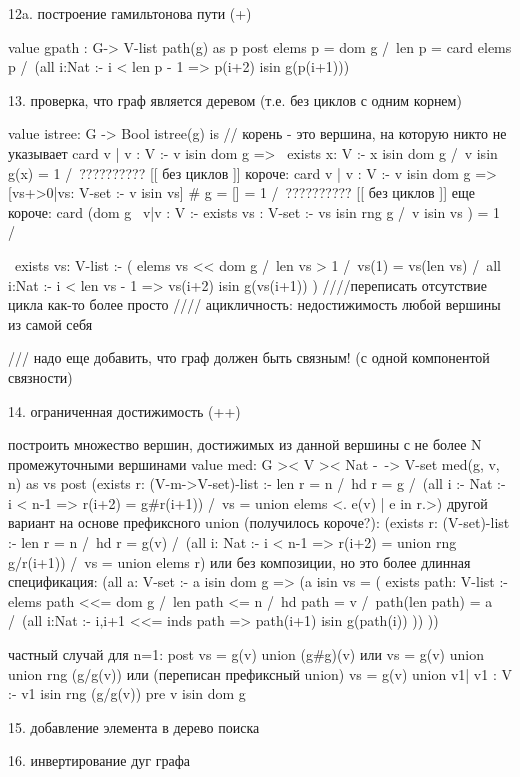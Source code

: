 \documentclass[14pt, twoside]{extreport}
\begin{document}
{12a. построение гамильтонова пути (+)

value gpath : G-> V-list
path(g) as p
post
elems p = dom g /\ len p = card elems p /\
(all i:Nat :- i < len p - 1 => p(i+2) isin g(p(i+1)))

13. проверка, что граф является деревом (т.е. без циклов с одним корнем)

value istree: G -> Bool
istree(g) is
// корень - это вершина, на которую никто не указывает
card { v | v : V :- v isin dom g =>  ~exists x: V :- x isin dom g /\ v isin g(x) } = 1 /\ ?????????? [[ без циклов ]]
короче:
card { v | v : V :- v isin dom g =>  [vs+>0|vs: V-set :- v isin vs] # g = [] } = 1 /\ ?????????? [[ без циклов ]]
еще короче:
card (dom g \ {v|v : V :- exists vs : V-set :- vs isin rng g /\ v isin vs }) = 1 /\

~exists vs: V-list :- ( elems vs << dom g /\ len vs > 1 /\ vs(1) = vs(len vs) /\
all i:Nat :- i < len vs - 1 => vs(i+2) isin g(vs(i+1)) )                                                           ////переписать отсутствие цикла как-то более просто
//// ацикличность: недостижимость любой вершины из самой себя

/// надо еще добавить, что граф должен быть связным! (с одной компонентой связности)

14. ограниченная достижимость (++)

построить множество вершин, достижимых из данной вершины с не более N промежуточными вершинами
value  med: G >< V >< Nat -~-> V-set
med(g, v, n) as vs
post
(exists r: (V-m->V-set)-list :- len r = n /\ hd r = g /\ (all i :- Nat :- i < n-1 => r(i+2) = g#r(i+1)) /\ vs =  union elems <. e(v) | e in r.>)
другой вариант на основе префиксного union (получилось короче?):
(exists r: (V-set)-list :- len r = n /\ hd r = g(v) /\ (all i: Nat :- i < n-1 => r(i+2) = union rng g/r(i+1)) /\ vs = union elems r)
или без композиции, но это более длинная спецификация:
(all a: V-set :- a isin dom g => (a isin vs = ( exists path: V-list :- elems path <<= dom g /\ len path <= n /\ hd path =  v /\ path(len path) = a /\ (all i:Nat :- {i,i+1} <<= inds path => path(i+1) isin g(path(i)) )) ))

частный случай для n=1:
post  vs = g(v) union (g#g)(v)
или vs = g(v) union union rng (g/g(v))
или (переписан префиксный union) vs = g(v) union { v1| v1 : V :- v1 isin rng (g/g(v))}
pre v isin dom g

15. добавление элемента в дерево поиска

16. инвертирование дуг графа


}
\end{document}
